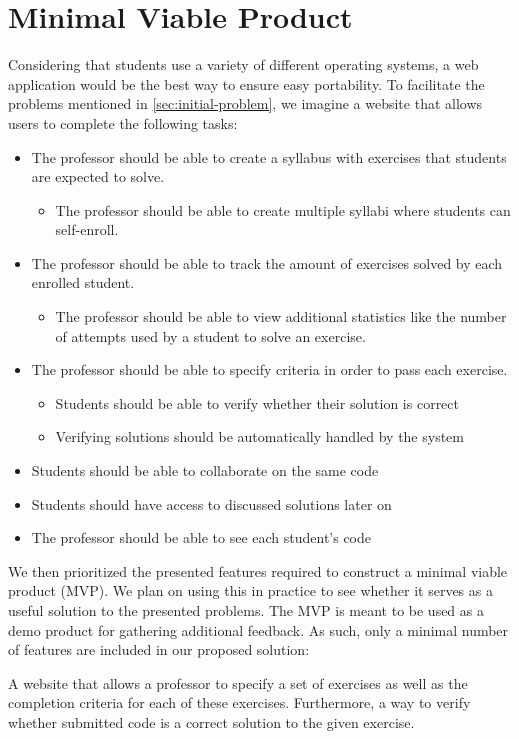\section{Minimal Viable Product}
Considering that students use a variety of different operating systems, a web application would be the best way to ensure easy portability.
To facilitate the problems mentioned in \ref{sec:initial-problem}, we imagine a website that allows users to complete the following tasks:
\begin{itemize}
	\item The professor should be able to create a syllabus with exercises that students are expected to solve.
	\begin{itemize}
		\item The professor should be able to create multiple syllabi where students can self-enroll.
	\end{itemize}
	\item The professor should be able to track the amount of exercises solved by each enrolled student.
	\begin{itemize}
		\item The professor should be able to view additional statistics like the number of attempts used by a student to solve an exercise.
	\end{itemize}
	\item The professor should be able to specify criteria in order to pass each exercise.
	\begin{itemize}
		\item Students should be able to verify whether their solution is correct
		\item Verifying solutions should be automatically handled by the system
	\end{itemize}
	\item Students should be able to collaborate on the same code
	\item Students should have access to discussed solutions later on
	\item The professor should be able to see each student's code
\end{itemize}

We then prioritized the presented features required to construct a minimal viable product (MVP).
We plan on using this in practice to see whether it serves as a useful solution to the presented problems. 
The MVP is meant to be used as a demo product for gathering additional feedback.
As such, only a minimal number of features are included in our proposed solution:

\begin{displayquote}
A website that allows a professor to specify a set of exercises as well as the completion criteria for each of these exercises. Furthermore, a way to verify whether submitted code is a correct solution to the given exercise.
\end{displayquote}